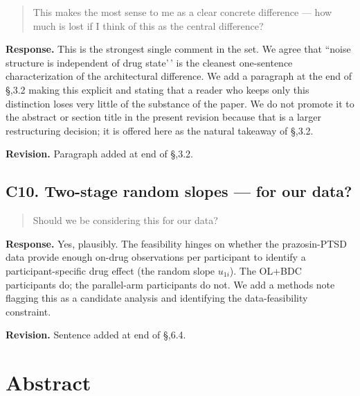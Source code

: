 \documentclass[
]{article}
\begin{document}
\begin{quote}
This makes the most sense to me as a clear concrete difference ---
how much is lost if I think of this as the central difference?
\end{quote}

\textbf{Response.} This is the strongest single comment in the set.
We agree that ``noise structure is independent of drug state'\,' is
the cleanest one-sentence characterization of the architectural
difference. We add a paragraph at the end of \S,3.2 making this
explicit and stating that a reader who keeps only this distinction
loses very little of the substance of the paper. We do not promote
it to the abstract or section title in the present revision because
that is a larger restructuring decision; it is offered here as the
natural takeaway of \S,3.2.

\textbf{Revision.} Paragraph added at end of \S,3.2.

\subsection*{C10. Two-stage random slopes --- for our data?}

\begin{quote}
Should we be considering this for our data?
\end{quote}

\textbf{Response.} Yes, plausibly. The feasibility hinges on
whether the prazosin-PTSD data provide enough on-drug observations
per participant to identify a participant-specific drug effect (the
random slope \(u_{1i}\)). The OL+BDC participants do; the
parallel-arm participants do not. We add a methods note flagging
this as a candidate analysis and identifying the data-feasibility
constraint.

\textbf{Revision.} Sentence added at end of \S,6.4.

\clearpage

\section{Abstract}
\end{document}
